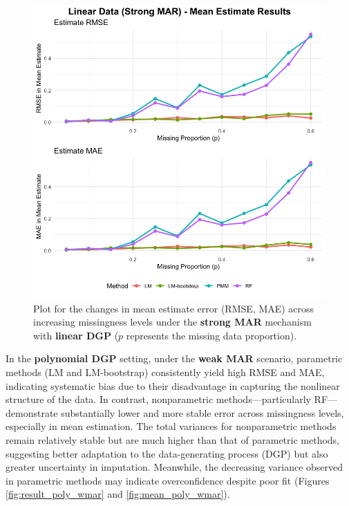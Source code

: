 \documentclass[12pt,oneside]{amsart}
\theoremstyle{definition}
\theoremstyle{remark}
\numberwithin{equation}{section}
\begin{document}
\begin{figure}[ht]
\begin{minipage}[b]{0.48\linewidth}
        \includegraphics[width=\linewidth]{Report/Figure/mean_linear_mar.jpg}
        \caption{Plot for the changes in mean estimate error (RMSE, MAE) across increasing missingness levels under the \textbf{strong MAR} mechanism with \textbf{linear DGP} ($p$ represents the missing data proportion).}
        \label{fig:mean_linear_mar}
    \end{minipage}
\end{figure}

In the \textbf{polynomial DGP} setting, under the \textbf{weak MAR} scenario, parametric methods (LM and LM-bootstrap) consistently yield high RMSE and MAE, indicating systematic bias due to their disadvantage in capturing the nonlinear structure of the data. In contrast, nonparametric methods—particularly RF—demonstrate substantially lower and more stable error across missingness levels, especially in mean estimation. The total variances for nonparametric methods remain relatively stable but are much higher than that of parametric methods, suggesting better adaptation to the data-generating process (DGP) but also greater uncertainty in imputation. Meanwhile, the decreasing variance observed in parametric methods may indicate overconfidence despite poor fit (Figures \ref{fig:result_poly_wmar} and  \ref{fig:mean_poly_wmar}).
\end{document}

